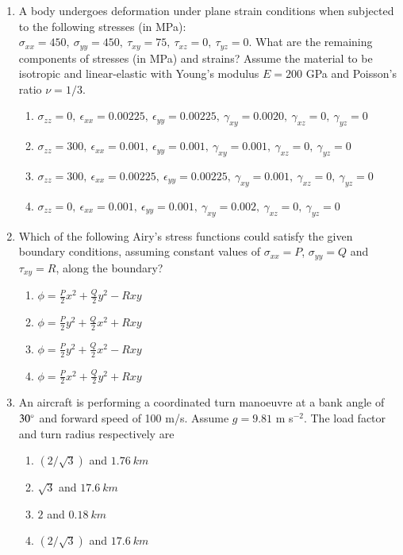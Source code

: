 \documentclass{article}
\begin{document}
\begin{enumerate}
\item A body undergoes deformation under plane strain conditions when subjected to the following stresses (in MPa): $\sigma_{xx}=450,\ \sigma_{yy}=450,\ \tau_{xy}=75,\ \tau_{xz}=0,\ \tau_{yz}=0$. What are the remaining components of stresses (in MPa) and strains? Assume the material to be isotropic and linear-elastic with Young’s modulus $E=200$ GPa and Poisson’s ratio $\nu=1/3$.
\begin{enumerate}
\item $\sigma_{zz}=0, \ \epsilon_{xx}=0.00225,\ \epsilon_{yy}=0.00225,\ \gamma_{xy}=0.0020,\ \gamma_{xz}=0,\ \gamma_{yz}=0$
\item $\sigma_{zz}=300, \ \epsilon_{xx}=0.001,\ \epsilon_{yy}=0.001,\ \gamma_{xy}=0.001,\ \gamma_{xz}=0,\ \gamma_{yz}=0$
\item $\sigma_{zz}=300, \ \epsilon_{xx}=0.00225,\ \epsilon_{yy}=0.00225,\ \gamma_{xy}=0.001,\ \gamma_{xz}=0,\ \gamma_{yz}=0$
\item $\sigma_{zz}=0, \ \epsilon_{xx}=0.001,\ \epsilon_{yy}=0.001,\ \gamma_{xy}=0.002,\ \gamma_{xz}=0,\ \gamma_{yz}=0$
\end{enumerate}

\item Which of the following Airy’s stress functions could satisfy the given boundary conditions, assuming constant values of $\sigma_{xx}=P$, $\sigma_{yy}=Q$ and $\tau_{xy}=R$, along the boundary?
\begin{figure}[H]
    \centering
    
    \caption{}
    \label{fig:q37}
\end{figure}
\begin{multicols}{2}
\begin{enumerate}
\item $\phi= \frac{P}{2}x^2 + \frac{Q}{2}y^2 - Rxy$
\item $\phi= \frac{P}{2}y^2 + \frac{Q}{2}x^2 + Rxy$
\item $\phi= \frac{P}{2}y^2 + \frac{Q}{2}x^2 - Rxy$
\item $\phi= \frac{P}{2}x^2 + \frac{Q}{2}y^2 + Rxy$
\end{enumerate}
\end{multicols}

\item An aircraft is performing a coordinated turn manoeuvre at a bank angle of $30\degree$ and forward speed of 100 m/s. Assume $g=9.81$ m s$^{-2}$. The load factor and turn radius respectively are
\begin{multicols}{2}
\begin{enumerate}
\item $(2/\sqrt{3})$ and $1.76\ km$
\item $\sqrt{3}$ and $17.6\ km$
\item $2$ and $0.18\ km$
\item $(2/\sqrt{3})$ and $17.6\ km$
\end{enumerate}
\end{multicols}


\end{enumerate}
\end{document}
